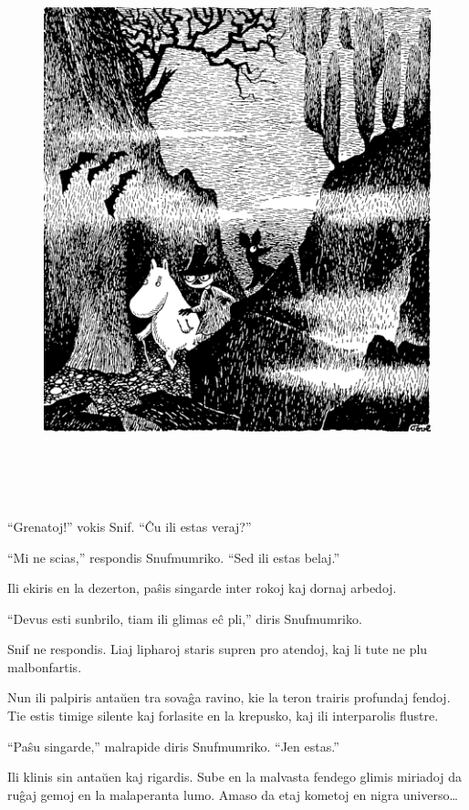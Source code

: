 \begin{figure}[htbp]
\centering
\includegraphics[width=425pt,height=463pt]{3-5.png}
\caption{}
\label{3-5}
\end{figure}

``Grenatoj!'' vokis Snif. ``Ĉu ili estas veraj?''

``Mi ne scias,'' respondis Snufmumriko. ``Sed ili estas belaj.''

Ili ekiris en la dezerton, paŝis singarde inter rokoj kaj dornaj arbedoj.

``Devus esti sunbrilo, tiam ili glimas eĉ pli,'' diris Snufmumriko.

Snif ne respondis. Liaj lipharoj staris supren pro atendoj, kaj li tute ne plu malbonfartis.

Nun ili palpiris antaŭen tra sovaĝa ravino, kie la teron trairis profundaj fendoj. Tie estis timige silente kaj forlasite en la krepusko, kaj ili interparolis flustre.

``Paŝu singarde,'' malrapide diris Snufmumriko. ``Jen estas.''

Ili klinis sin antaŭen kaj rigardis. Sube en la malvasta fendego glimis miriadoj da ruĝaj gemoj en la malaperanta lumo. Amaso da etaj kometoj en nigra universo{\ldots}

